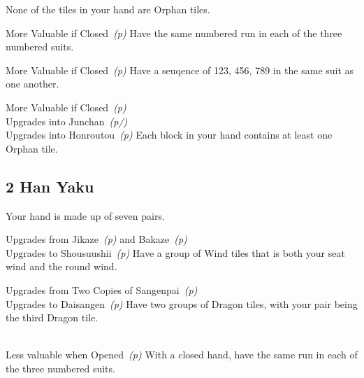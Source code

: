 	{}
	{None of the tiles in your hand are Orphan tiles.}

	{\morevaluable More Valuable if Closed~\textit{(p\pageref{core:yaku:Menzen Sanshoku Doujun})}}
	{Have the same numbered run in each of the three numbered suits.}

	{\morevaluable More Valuable if Closed~\textit{(p\pageref{core:yaku:Menzen Ittsuu})}}
	{Have a seuqence of 123, 456, 789 in the same suit as one another.}

	{\morevaluable More Valuable if Closed~\textit{(p\pageref{core:yaku:Menzen Chanta})}\\
	\upgradesto Upgrades into Junchan~\textit{(p\pageref{core:yaku:Junchan}/\pageref{core:yaku:Menzen Junchan})}\\
	\upgradesto Upgrades into Honroutou~\textit{(p\pageref{core:yaku:Honroutou})}}
	{Each block in your hand contains at least one Orphan tile.}


\subsection{2 Han Yaku}\label{core:ssec:2-han-yaku}

	{\closedhand}
	{Your hand is made up of seven pairs.}

	{\upgradesfrom Upgrades from Jikaze~\textit{(p\pageref{core:yaku:Jikaze})} and Bakaze~\textit{(p\pageref{core:yaku:Bakaze})}\\
	\upgradesto Upgrades to Shousuushii~\textit{(p\pageref{core:yaku:Shousuushii})}}
	{Have a group of Wind tiles that is both your seat wind and the round wind.}

	{\upgradesfrom Upgrades from Two Copies of Sangenpai~\textit{(p\pageref{core:yaku:Sangenpai})}\\ 
	\upgradesto Upgrades to Daisangen~\textit{(p\pageref{core:yaku:Daisangen})}}
	{Have two groups of Dragon tiles, with your pair being the third Dragon tile.}

	{\closedhand \\ 
	\lessvaluable Less valuable when Opened~\textit{(p\pageref{core:yaku:Sanshoku Doujun})}}
	{With a closed hand, have the same run in each of the three numbered suits.}

